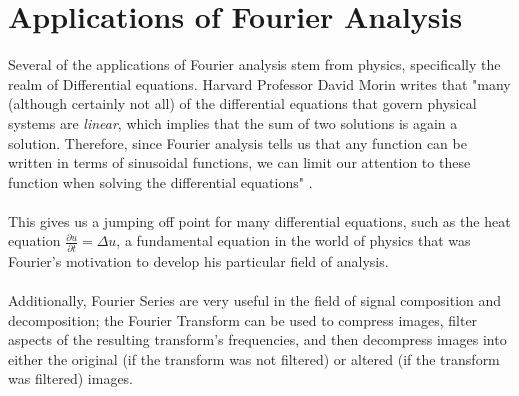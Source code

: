 \documentclass[12pt]{article}
\begin{document}
    \section{Applications of Fourier Analysis}
    Several of the applications of Fourier analysis stem from physics, specifically the realm of Differential equations. Harvard Professor David Morin writes that "many (although certainly not all) of the differential equations that govern physical systems are \emph{linear}, which implies that the sum of two solutions is again a solution. Therefore, since Fourier analysis tells us that any function can be written in terms of sinusoidal functions, we can limit our attention to these function when solving the differential equations" \cite{harvard}. \\\\
    This gives us a jumping off point for many differential equations, such as the heat equation $\frac{\partial u}{\partial t} = \Delta u$, a fundamental equation in the world of physics that was Fourier's motivation to develop his particular field of analysis. \\\\
    Additionally, Fourier Series are very useful in the field of signal composition and decomposition; the Fourier Transform can be used to compress images, filter aspects of the resulting transform's frequencies, and then decompress images into either the original (if the transform was not filtered) or altered (if the transform was filtered) images.
\end{document}
